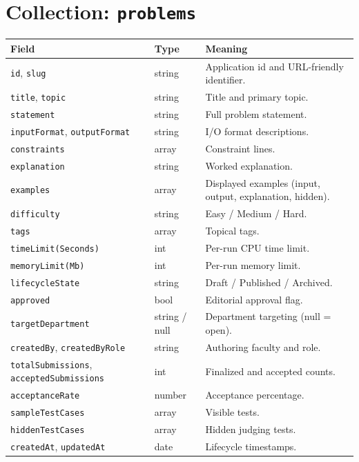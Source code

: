 \documentclass[12pt,a4paper,oneside]{report}
\newcommand{\code}[1]{\texttt{#1}}
\begin{document}
\section{Collection: \code{problems}}
\begin{xltabular}{\linewidth}{@{}l l X@{}}
\toprule
\textbf{Field} & \textbf{Type} & \textbf{Meaning}\\
\midrule
\endhead
\code{id}, \code{slug} & string & Application id and URL-friendly identifier.\\
\code{title}, \code{topic} & string & Title and primary topic.\\
\code{statement} & string & Full problem statement.\\
\code{inputFormat}, \code{outputFormat} & string & I/O format descriptions.\\
\code{constraints} & array & Constraint lines.\\
\code{explanation} & string & Worked explanation.\\
\code{examples} & array & Displayed examples (input, output, explanation, hidden).\\
\code{difficulty} & string & Easy / Medium / Hard.\\
\code{tags} & array & Topical tags.\\
\code{timeLimit(Seconds)} & int & Per-run CPU time limit.\\
\code{memoryLimit(Mb)} & int & Per-run memory limit.\\
\code{lifecycleState} & string & Draft / Published / Archived.\\
\code{approved} & bool & Editorial approval flag.\\
\code{targetDepartment} & string / null & Department targeting (null = open).\\
\code{createdBy}, \code{createdByRole} & string & Authoring faculty and role.\\
\code{totalSubmissions}, \code{acceptedSubmissions} & int & Finalized and accepted counts.\\
\code{acceptanceRate} & number & Acceptance percentage.\\
\code{sampleTestCases} & array & Visible tests.\\
\code{hiddenTestCases} & array & Hidden judging tests.\\
\code{createdAt}, \code{updatedAt} & date & Lifecycle timestamps.\\
\bottomrule
\end{xltabular}
\end{document}
